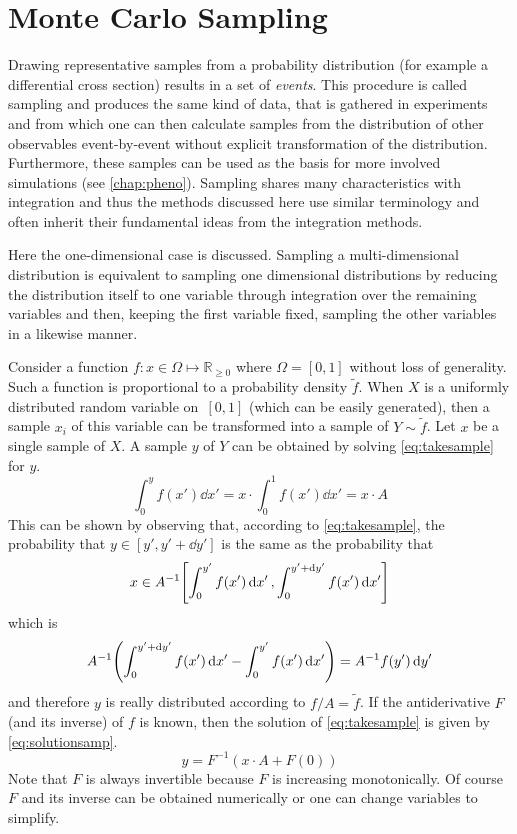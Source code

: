 \section{Monte Carlo Sampling}%
\label{sec:mcsamp}

Drawing representative samples from a probability distribution (for
example a differential cross section) results in a set of
\emph{events}. This procedure is called sampling and produces the same
kind of data, that is gathered in experiments and from which one can
then calculate samples from the distribution of other observables
event-by-event without explicit transformation of the
distribution. Furthermore, these samples can be used as the basis for
more involved simulations (see \cref{chap:pheno}). Sampling shares
many characteristics with integration and thus the methods discussed
here use similar terminology and often inherit their fundamental ideas
from the integration methods.

Here the one-dimensional case is discussed.  Sampling a
multi-dimensional distribution is equivalent to sampling one
dimensional distributions by reducing the distribution itself to one
variable through integration over the remaining variables and then,
keeping the first variable fixed, sampling the other variables in a
likewise manner.

Consider a function \(f\colon x\in\Omega\mapsto\mathbb{R}_{\geq 0}\)
where \(\Omega = [0, 1]\) without loss of generality. Such a function
is proportional to a probability density \(\tilde{f}\). When \(X\) is
a uniformly distributed random variable on~\([0, 1]\) (which can be
easily generated), then a sample \({x_i}\) of this variable can be
transformed into a sample of \(Y\sim\tilde{f}\). Let \(x\) be a single
sample of \(X\). A sample \(y\) of \(Y\) can be obtained by
solving \cref{eq:takesample} for \(y\).
%
\begin{equation}
  \label{eq:takesample}
  \int_{0}^{y}f(x')\dd{x'} = x\cdot\int_0^1f(x')\dd{x'} = x\cdot A
\end{equation}
%
This can be shown by observing that, according to
\cref{eq:takesample}, the probability that \(y\in[y', y'+\dd{y}']\) is
the same as the probability that
\[x\in A^{-1}\qty[\int_{0}^{y'}f(x')\dd{x'},
\int_{0}^{y'+\dd{y}'}f(x')\dd{x'}]\] which is
\[A^{-1}\qty(\int_{0}^{y'+\dd{y}'}f(x')\dd{x'} -
  \int_{0}^{y'}f(x')\dd{x'}) = A^{-1} f(y')\dd{y}'\] and therefore
\(y\) is really distributed according to \(f/A=\tilde{f}\). If the
antiderivative \(F\) (and its inverse) of \(f\) is known, then the
solution of \cref{eq:takesample} is given by \cref{eq:solutionsamp}.
%
\begin{equation}
  \label{eq:solutionsamp}
  y = F^{-1}(x\cdot A + F(0))
\end{equation}
%
Note that \(F\) is always invertible because \(F\) is
increasing monotonically. Of course \(F\) and its inverse can be
obtained numerically or one can change variables to simplify.


